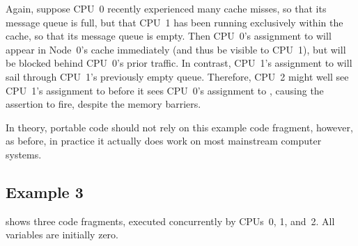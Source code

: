 Again, suppose CPU~0 recently experienced many cache misses, so that its
message queue is full, but that CPU~1 has been running exclusively within
the cache, so that its message queue is empty.
Then CPU~0's assignment to  will appear in Node~0's cache
immediately (and thus be visible to CPU~1), but will be blocked behind
CPU~0's prior traffic.
In contrast, CPU~1's assignment to  will sail through CPU~1's
previously empty queue.
Therefore, CPU~2 might well see CPU~1's assignment to  before
it sees CPU~0's assignment to , causing the assertion to fire,
despite the memory barriers.

In theory, portable code should not rely on this example code fragment,
however, as before, in practice it actually does work on most
mainstream computer systems.

\subsection{Example 3}
\label{sec:app:whymb:Example 3}

shows three code fragments, executed concurrently by CPUs~0, 1, and~2.
All variables are initially zero.

\begin{listing*}
\scriptsize
{}
\caption{Memory Barrier Example 3}
\label{lst:app:whymb:Memory Barrier Example 3}
\end{listing*}


